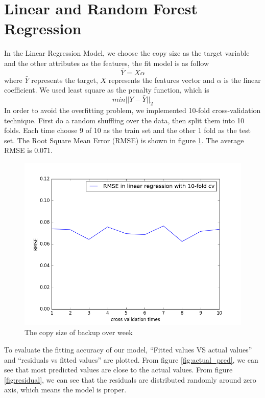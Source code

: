 \documentclass{article}
\begin{document}
\section{Linear and Random Forest Regression}
In the Linear Regression Model, we choose the copy size as the target variable and the other attributes as the features, the fit model is as follow
\begin{equation*}
\bar{Y} = X\alpha
\end{equation*}
where $\bar{Y}$ represents the target, $X$ represents the features vector and $\alpha$ is the linear coefficient. We used least square as the penalty function, which is
\begin{equation*}
min || Y - \bar{Y} ||_2
\end{equation*}
In order to avoid the overfitting problem, we implemented 10-fold cross-validation technique. First do a random shuffling over the data, then split them into 10 folds. Each time choose 9 of 10 as the train set and the other 1 fold as the test set. The Root Square Mean Error (RMSE) is shown in figure \ref{fig:rmse_lr}. The average RMSE is 0.071.
\begin{figure}[htbp]
\centering
\includegraphics[width=.6\textwidth]{rmse_linear.png}
\caption{The copy size of backup over week}
\label{fig:rmse_lr}
\end{figure}
To evaluate the fitting accuracy of our model, “Fitted values VS actual values” and “residuals vs fitted values” are plotted. From figure \ref{fig:actual_pred}, we can see that most predicted values are close to the actual values. From figure \ref{fig:residual}, we can see that the residuals are distributed randomly around zero axis, which means the model is proper.\\
\end{document}
